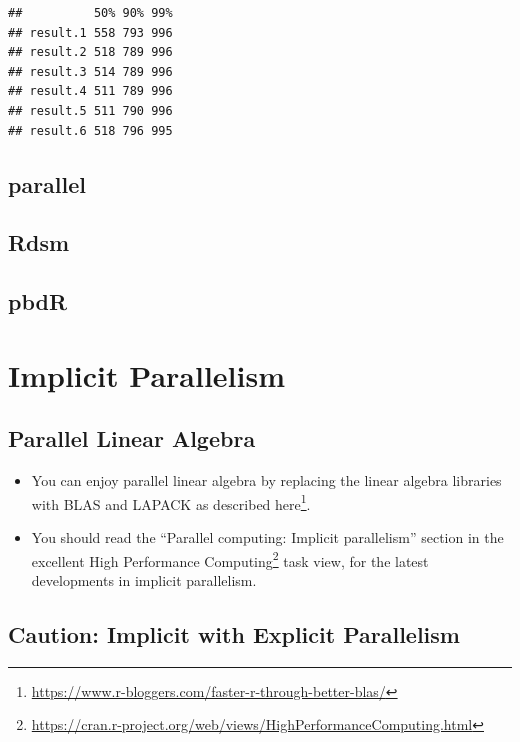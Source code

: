 \documentclass[]{book}
\providecommand{\tightlist}{%
  \setlength{\itemsep}{0pt}\setlength{\parskip}{0pt}}
\renewcommand{\href}[2]{#2\footnote{\url{#1}}}
\theoremstyle{definition}
\theoremstyle{definition}
\theoremstyle{definition}
\theoremstyle{remark}
\begin{document}
\begin{verbatim}
##          50% 90% 99%
## result.1 558 793 996
## result.2 518 789 996
## result.3 514 789 996
## result.4 511 789 996
## result.5 511 790 996
## result.6 518 796 995
\end{verbatim}

\hypertarget{parallel-1}{%
\subsection{parallel}\label{parallel-1}}

\hypertarget{rdsm}{%
\subsection{Rdsm}\label{rdsm}}

\hypertarget{pbdr}{%
\subsection{pbdR}\label{pbdr}}

\hypertarget{implicit-parallelism}{%
\section{Implicit Parallelism}\label{implicit-parallelism}}

\hypertarget{parallel-linear-algebra}{%
\subsection{Parallel Linear Algebra}\label{parallel-linear-algebra}}

\begin{itemize}
\tightlist
\item
  You can enjoy parallel linear algebra by replacing the linear algebra libraries with BLAS and LAPACK as described \href{https://www.r-bloggers.com/faster-r-through-better-blas/}{here}.
\item
  You should read the ``Parallel computing: Implicit parallelism'' section in the excellent \href{https://cran.r-project.org/web/views/HighPerformanceComputing.html}{High Performance Computing} task view, for the latest developments in implicit parallelism.
\end{itemize}

\hypertarget{caution-implicit-with-explicit-parallelism}{%
\subsection{Caution: Implicit with Explicit Parallelism}\label{caution-implicit-with-explicit-parallelism}}
\end{document}
